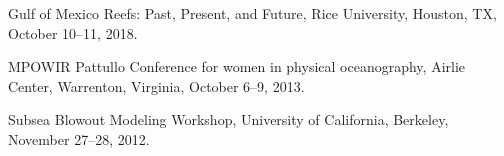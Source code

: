 \documentclass[10pt,letterpaper]{article}
\renewenvironment{itemize}{
  \begin{list}{}{
    \setlength{\leftmargin}{1.5em}
    \setlength{\itemsep}{0.25em}
    \setlength{\parskip}{0pt}
    \setlength{\parsep}{0.25em}
  }
}{
  \end{list}
}
\begin{document}
\begin{itemize}

\item Gulf of Mexico Reefs: Past, Present, and Future, Rice University,  Houston, TX, October 10--11, 2018.

\item MPOWIR Pattullo Conference for women in physical oceanography, Airlie Center, Warrenton, Virginia, October 6--9, 2013.





\item Subsea Blowout Modeling Workshop, University of California, Berkeley, November 27--28, 2012.







\end{itemize}
\end{document}
